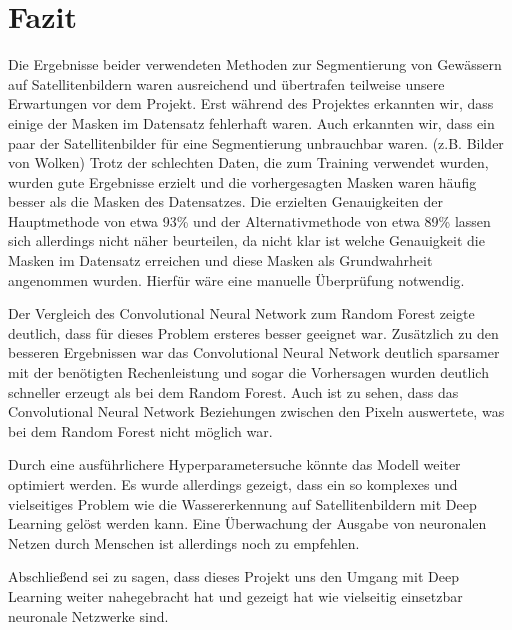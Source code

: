 \section{Fazit}
\label{sec:Fazit}

Die Ergebnisse beider verwendeten Methoden zur Segmentierung von Gewässern auf Satellitenbildern waren ausreichend
und übertrafen teilweise unsere Erwartungen vor dem Projekt.
Erst während des Projektes erkannten wir, dass einige der Masken im Datensatz fehlerhaft waren.
Auch erkannten wir, dass ein paar der Satellitenbilder für eine Segmentierung unbrauchbar waren. (z.B. Bilder von Wolken)
Trotz der schlechten Daten, die zum Training verwendet wurden, wurden gute Ergebnisse erzielt 
und die vorhergesagten Masken waren häufig besser als die Masken des Datensatzes.
Die erzielten Genauigkeiten der Hauptmethode von etwa 93\% und der Alternativmethode von etwa 89\% lassen sich allerdings nicht näher beurteilen, 
da nicht klar ist welche Genauigkeit die Masken im Datensatz erreichen und diese Masken als Grundwahrheit angenommen wurden.
Hierfür wäre eine manuelle Überprüfung notwendig.

Der Vergleich des Convolutional Neural Network zum Random Forest zeigte deutlich, dass für dieses Problem ersteres besser geeignet war.
Zusätzlich zu den besseren Ergebnissen war das Convolutional Neural Network deutlich sparsamer mit der benötigten Rechenleistung 
und sogar die Vorhersagen wurden deutlich schneller erzeugt als bei dem Random Forest.
Auch ist zu sehen, dass das Convolutional Neural Network Beziehungen zwischen den Pixeln auswertete, was bei dem Random Forest nicht möglich war.

Durch eine ausführlichere Hyperparametersuche könnte das Modell weiter optimiert werden. 
Es wurde allerdings gezeigt, dass ein so komplexes und vielseitiges Problem 
wie die Wassererkennung auf Satellitenbildern mit Deep Learning gelöst werden kann.
Eine Überwachung der Ausgabe von neuronalen Netzen durch Menschen ist allerdings noch zu empfehlen.

Abschließend sei zu sagen, dass dieses Projekt uns den Umgang mit Deep Learning weiter nahegebracht hat 
und gezeigt hat wie vielseitig einsetzbar neuronale Netzwerke sind.
